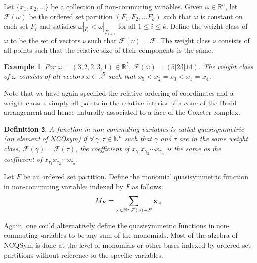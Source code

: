 \documentclass[11pt,letter]{amsart}
\newtheorem{definition}{Definition}
\newtheorem{example}[definition]{Example}
\begin{document}


Let $\{x_1, x_2, \ldots \}$ be a collection of non-commuting
variables.  Given $\omega\in \mathbb{R}^n$, let $\mathcal{F}(\omega)$
be the ordered set partition $(F_1,F_2, \ldots F_k)$ such that 
$\omega$ is constant on each set $F_i$
and satisfies $\omega|_{F_i} < \omega|_{F_{i+1}}$ for all $1 \leq i \leq k$. 
Define the weight class of $\omega$ to be the set of vectors $\nu$
such that $\mathcal{F}(\nu) = \mathcal{F}$.  The weight class $\nu$ consists of all 
points such that the relative size of their components is the same.

\begin{example}
For $\omega = (3,2,2,3,1) \in \mathbb{R}^5$, $\mathcal{F}(\omega) =
(5|23|14)$.  The weight class of $\omega$ consists of all vectors $x
\in \mathbb{R}^5$ such that $x_5 < x_2 = x_3 < x_1 = x_4$. 
\end{example}

Note that
we have again specified the relative ordering of coordinates and a
weight class is simply all points in the relative interior of a cone
of the Braid arrangement and hence naturally associated to a face of
the Coxeter complex.


\begin{definition}
A function in non-commuting variables is called quasisymmetric (an element of NCQsym) if
$\forall \, \gamma, \tau \in \mathbb{N}^n$ such that $\gamma$ and $\tau$
are in the same weight class, $\mathcal{F}(\gamma) =
\mathcal{F}(\tau)$, the coefficient of $x_{\gamma_1}x_{\gamma_2} \cdots
x_{\gamma_n}$ is the same as the coefficient of $x_{\tau_1}x_{\tau_2} \cdots x_{\tau_n}$.
\end{definition}

Let $F$ be an ordered set partition.  Define the monomial quasisymmetric function in non-commuting variables indexed by $F$ as follows:
$$M_F = \sum_{\omega \in \mathbb{N}^n \, \mathcal{F}(\omega) = F} {\bf{x}}_{\omega}$$

Again, one could alternatively define the quasisymmetric functions in
non-commuting variables to be any sum of the monomials.  Most of the
algebra of NCQSym is done at the level of monomials or other bases
indexed by ordered set partitions without reference to the specific
variables.  
\end{document}
